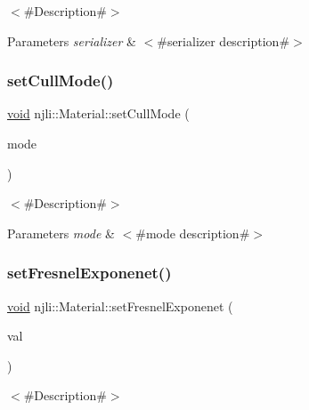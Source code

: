 $<$\#\+Description\#$>$


\begin{DoxyParams}{Parameters}
{\em serializer} & $<$\#serializer description\#$>$ \\
\hline
\end{DoxyParams}
\mbox{\label{classnjli_1_1_material_a2ddcfec45012339d0b771c08e76985c0}} 
\subsubsection{\texorpdfstring{set\+Cull\+Mode()}{setCullMode()}}
{\footnotesize\ttfamily \mbox{\hyperlink{_thread_8h_af1e856da2e658414cb2456cb6f7ebc66}{void}} njli\+::\+Material\+::set\+Cull\+Mode (\begin{DoxyParamCaption}\item[{const \mbox{\hyperlink{namespacenjli_a2247adafa5de18bc18550918b4ed48d8}{njli\+Cull\+Mode}}}]{mode }\end{DoxyParamCaption})}

$<$\#\+Description\#$>$


\begin{DoxyParams}{Parameters}
{\em mode} & $<$\#mode description\#$>$ \\
\hline
\end{DoxyParams}
\mbox{\label{classnjli_1_1_material_a8f725eb3d8e586c3f8e02c51cfd8bb42}} 
\subsubsection{\texorpdfstring{set\+Fresnel\+Exponenet()}{setFresnelExponenet()}}
{\footnotesize\ttfamily \mbox{\hyperlink{_thread_8h_af1e856da2e658414cb2456cb6f7ebc66}{void}} njli\+::\+Material\+::set\+Fresnel\+Exponenet (\begin{DoxyParamCaption}\item[{const \mbox{\hyperlink{_util_8h_a5f6906312a689f27d70e9d086649d3fd}{f32}}}]{val }\end{DoxyParamCaption})}

$<$\#\+Description\#$>$


